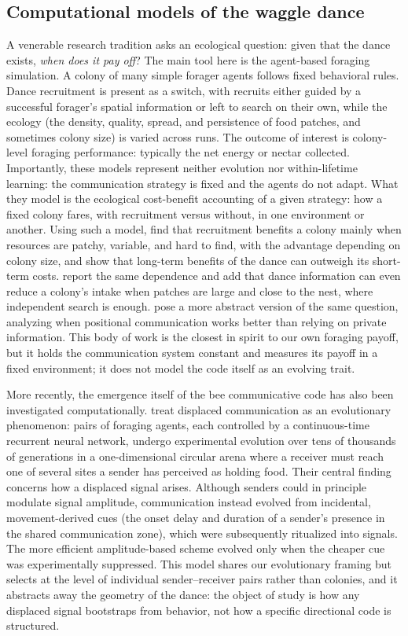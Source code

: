 \documentclass[11pt]{article}
\begin{document}
\subsection{Computational models of the waggle dance}
A venerable research tradition asks an ecological question: given that the dance
exists, \emph{when does it pay off}? The main tool here is the agent-based
foraging simulation. A colony of many simple forager agents follows fixed
behavioral rules. Dance recruitment is present as a switch, with recruits either
guided by a successful forager's spatial information or left to search on their
own, while the ecology (the density, quality, spread, and persistence of food
patches, and sometimes colony size) is varied across runs. The outcome of
interest is colony-level foraging performance: typically the net energy or
nectar collected. Importantly, these models represent neither evolution nor
within-lifetime learning: the communication strategy is fixed and the agents do
not adapt. What they model is the ecological cost-benefit accounting of a given
strategy: how a fixed colony fares, with recruitment versus without, in one
environment or another. Using such a model, \citet{dornhaus2006benefits} find
that recruitment benefits a colony mainly when resources are patchy, variable,
and hard to find, with the advantage depending on colony size, and
\citet{schurch2014dancing} show that long-term benefits of the dance can outweigh
its short-term costs. \citet{beekman2008pay} report the same dependence and add
that dance information can even reduce a colony's intake when patches are large
and close to the nest, where independent search is enough.
\citet{bailis2010positional} pose a more abstract version
of the same question, analyzing when positional communication works better than relying on
private information.  This body of work is the closest in spirit to our own
foraging payoff, but it holds the communication system constant and measures its
payoff in a fixed environment; it does not model the code itself as an evolving
trait.

More recently, the emergence itself of the bee communicative code has also been
investigated computationally. \citet{10.1371/journal.pcbi.1010487} treat
displaced communication as an evolutionary phenomenon: pairs of foraging agents,
each controlled by a continuous-time recurrent neural network, undergo
experimental evolution over tens of thousands of generations in a
one-dimensional circular arena where a receiver must reach one of several sites
a sender has perceived as holding food. Their central finding concerns how a
displaced signal arises. Although senders could in principle modulate  signal
amplitude, communication instead evolved from incidental, movement-derived cues
(the onset delay and duration of a sender's presence in the shared communication
zone), which were subsequently ritualized into signals. The more efficient
amplitude-based scheme evolved only when the cheaper cue was experimentally
suppressed. This model shares our evolutionary framing but selects at the level
of individual sender--receiver pairs rather than colonies, and it abstracts away
the geometry of the dance: the object of study is how any displaced signal
bootstraps from behavior, not how a specific directional code is structured.
\end{document}
